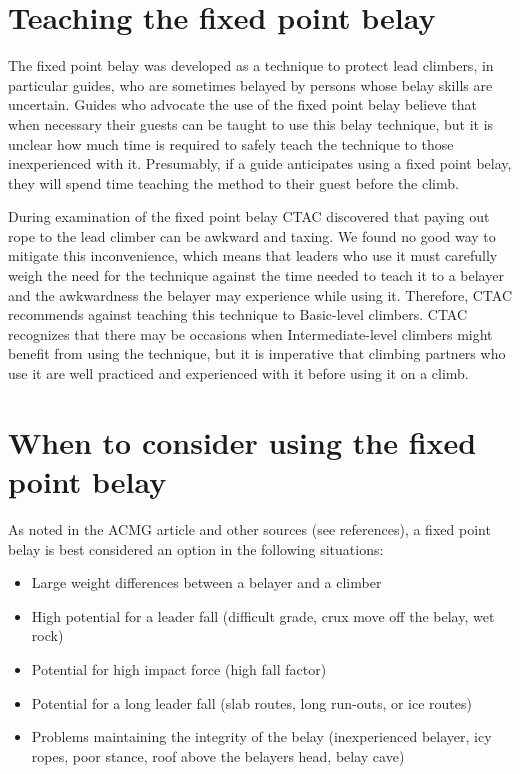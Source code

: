 \documentclass[nonacm,acmtog]{acmart}
\begin{document}
\section{Teaching the fixed point belay}
The fixed point belay was developed as a technique to protect lead climbers, in
particular guides,  who are sometimes belayed by persons whose belay skills are
uncertain. Guides who advocate the use of the fixed point belay believe that
when necessary their guests can be taught to use this belay technique, but it
is unclear how much time is required to safely teach the technique to those
inexperienced with it. Presumably, if a guide anticipates using a fixed point
belay, they will spend time teaching the method to their guest before the
climb.

During examination of the fixed point belay CTAC discovered that paying out
rope to the lead climber can be awkward and taxing. We found no good way to
mitigate this inconvenience, which means that leaders who use it must carefully
weigh the need for the technique against the time needed to teach it to a
belayer and the awkwardness the belayer may experience while using it.
Therefore, CTAC recommends against teaching this technique to Basic-level
climbers. CTAC recognizes that there may be occasions when Intermediate-level
climbers might benefit from using the technique, but it is imperative that
climbing partners who use it are well practiced and experienced with it before
using it on a climb.

\section{When to consider using the fixed point belay}
As noted in the ACMG article and other sources (see references), a fixed point
belay is best considered an option in the following situations:

\begin{itemize}
\item Large weight differences between a belayer and a climber
\item High potential for a leader fall (difficult grade, crux move off the
belay, wet rock)
\item Potential for high impact force (high fall factor)
\item Potential for a long leader fall (slab routes, long run-outs, or ice
routes)
\item Problems maintaining the integrity of the belay (inexperienced belayer,
icy ropes, poor stance, roof above the belayers head, belay cave)
\end{itemize}
\end{document}
